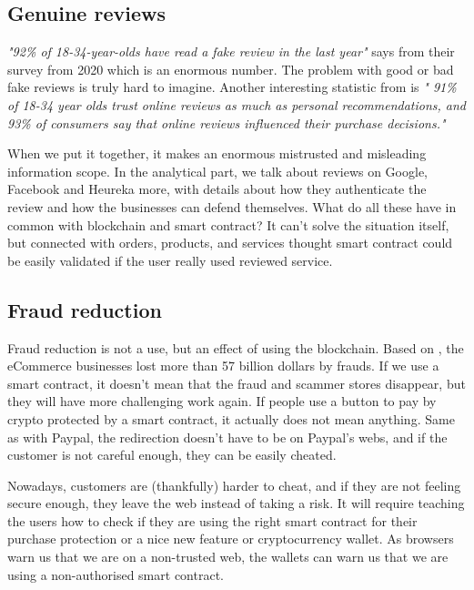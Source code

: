 \documentclass[thesis=M,english]{FITthesis}[2019/12/23]
\begin{document}
\subsection{Genuine reviews}
\emph{"92\% of 18-34-year-olds have read a fake review in the last year" }
says \cite{brightLocalStat} from their \cite{brightLocalSurway} survey from 2020 which is an enormous number. The problem with good or bad fake reviews is truly hard to imagine. Another interesting statistic from \cite{qualtrics} is \emph{" 91\% of 18-34 year olds trust online reviews as much as personal recommendations, and 93\% of consumers say that online reviews influenced their purchase decisions."}

When we put it together, it makes an enormous mistrusted and misleading information scope. In the analytical part, we talk about reviews on Google, Facebook and Heureka more, with details about how they authenticate the review and how the businesses can defend themselves. What do all these have in common with blockchain and smart contract? It can't solve the situation itself, but connected with orders, products, and services thought smart contract could be easily validated if the user really used reviewed service. 

\subsection{Fraud reduction}
Fraud reduction is not a use, but an effect of using the blockchain. Based on \cite{fraud}, the eCommerce businesses lost more than 57 billion dollars by frauds. If we use a smart contract, it doesn't mean that the fraud and scammer stores disappear, but they will have more challenging work again. If people use a button to pay by crypto protected by a smart contract, it actually does not mean anything. Same as with Paypal, the redirection doesn't have to be on Paypal's webs, and if the customer is not careful enough, they can be easily cheated.

Nowadays, customers are (thankfully) harder to cheat, and if they are not feeling secure enough, they leave the web instead of taking a risk. It will require teaching the users how to check if they are using the right smart contract for their purchase protection or a nice new feature or cryptocurrency wallet. As browsers warn us that we are on a non-trusted web, the wallets can warn us that we are using a non-authorised smart contract.
\end{document}
